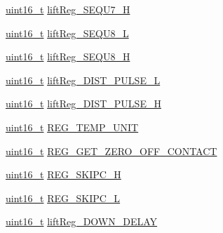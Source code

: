 \begin{DoxyCompactItemize}
\item 
\mbox{\hyperlink{settings_8h_a017dd44e68049ffdd31500a8cd01ba68}{uint16\+\_\+t}} \mbox{\hyperlink{structRegister_1_1LiftReg___1_1reg_aaa84a03a6e1de457db514345509602fd}{lift\+Reg\+\_\+\+S\+E\+Q\+U7\+\_\+H}}
\item 
\mbox{\hyperlink{settings_8h_a017dd44e68049ffdd31500a8cd01ba68}{uint16\+\_\+t}} \mbox{\hyperlink{structRegister_1_1LiftReg___1_1reg_a1f5dd2f081e3bbf722e5b1f45c89168d}{lift\+Reg\+\_\+\+S\+E\+Q\+U8\+\_\+L}}
\item 
\mbox{\hyperlink{settings_8h_a017dd44e68049ffdd31500a8cd01ba68}{uint16\+\_\+t}} \mbox{\hyperlink{structRegister_1_1LiftReg___1_1reg_ab449e1df8be6232b89c3c938830e2b10}{lift\+Reg\+\_\+\+S\+E\+Q\+U8\+\_\+H}}
\item 
\mbox{\hyperlink{settings_8h_a017dd44e68049ffdd31500a8cd01ba68}{uint16\+\_\+t}} \mbox{\hyperlink{structRegister_1_1LiftReg___1_1reg_a71ba6f1ca9caf2e1a68d6292f7ee5cdb}{lift\+Reg\+\_\+\+D\+I\+S\+T\+\_\+\+P\+U\+L\+S\+E\+\_\+L}}
\item 
\mbox{\hyperlink{settings_8h_a017dd44e68049ffdd31500a8cd01ba68}{uint16\+\_\+t}} \mbox{\hyperlink{structRegister_1_1LiftReg___1_1reg_a781e1567c108509c7e01dcf468b14625}{lift\+Reg\+\_\+\+D\+I\+S\+T\+\_\+\+P\+U\+L\+S\+E\+\_\+H}}
\item 
\mbox{\hyperlink{settings_8h_a017dd44e68049ffdd31500a8cd01ba68}{uint16\+\_\+t}} \mbox{\hyperlink{structRegister_1_1LiftReg___1_1reg_a7612e434618662a2144d457490084313}{R\+E\+G\+\_\+\+T\+E\+M\+P\+\_\+\+U\+N\+IT}}
\item 
\mbox{\hyperlink{settings_8h_a017dd44e68049ffdd31500a8cd01ba68}{uint16\+\_\+t}} \mbox{\hyperlink{structRegister_1_1LiftReg___1_1reg_a66ec56e41807ed2eab648e887af437c4}{R\+E\+G\+\_\+\+G\+E\+T\+\_\+\+Z\+E\+R\+O\+\_\+\+O\+F\+F\+\_\+\+C\+O\+N\+T\+A\+CT}}
\item 
\mbox{\hyperlink{settings_8h_a017dd44e68049ffdd31500a8cd01ba68}{uint16\+\_\+t}} \mbox{\hyperlink{structRegister_1_1LiftReg___1_1reg_a3bcf95441ceb72ea2d4762fceeff2bce}{R\+E\+G\+\_\+\+S\+K\+I\+P\+C\+\_\+H}}
\item 
\mbox{\hyperlink{settings_8h_a017dd44e68049ffdd31500a8cd01ba68}{uint16\+\_\+t}} \mbox{\hyperlink{structRegister_1_1LiftReg___1_1reg_a76e6e98b09d3b24af0a711612ec2588e}{R\+E\+G\+\_\+\+S\+K\+I\+P\+C\+\_\+L}}
\item 
\mbox{\hyperlink{settings_8h_a017dd44e68049ffdd31500a8cd01ba68}{uint16\+\_\+t}} \mbox{\hyperlink{structRegister_1_1LiftReg___1_1reg_a90d1d396792f4a36b5aefe08a5528e64}{lift\+Reg\+\_\+\+D\+O\+W\+N\+\_\+\+D\+E\+L\+AY}}

\end{DoxyCompactItemize}
